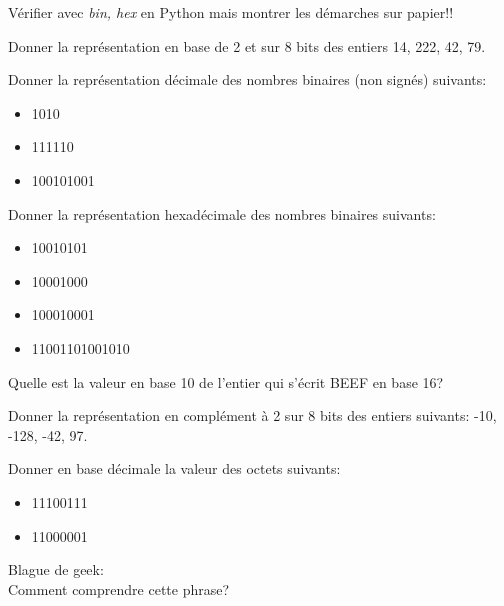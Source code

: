 \documentclass[a4paper,11pt]{article}
\begin{document}
\begin{Form}
\begin{commentprof}
Vérifier avec \emph{bin, hex} en Python mais montrer les démarches sur papier!!
\end{commentprof}
\begin{exo}
Donner la représentation en base de 2 et sur 8 bits des entiers 14, 222, 42, 79.
\end{exo}
\begin{exo}
Donner la représentation décimale des nombres binaires (non signés) suivants:
\begin{itemize}
\item 1010
\item 111110
\item 100101001
\end{itemize}
\end{exo}
\begin{exo}
Donner la représentation hexadécimale des nombres binaires suivants:
\begin{itemize}
\item 10010101
\item 10001000
\item 100010001
\item 11001101001010
\end{itemize}
\end{exo}
\begin{exo}
Quelle est la valeur en base 10 de l'entier qui s'écrit BEEF en base 16?
\end{exo}
\begin{exo}
Donner la représentation en complément à 2 sur 8 bits des entiers suivants: -10, -128, -42, 97.
\end{exo}
\begin{exo}
Donner en base décimale la valeur des octets suivants:
\begin{itemize}
\item 11100111
\item 11000001
\end{itemize}
\end{exo}
\begin{exo}
Blague de geek:\\
Comment comprendre cette phrase?
\end{exo}
\end{Form}
\end{document}
